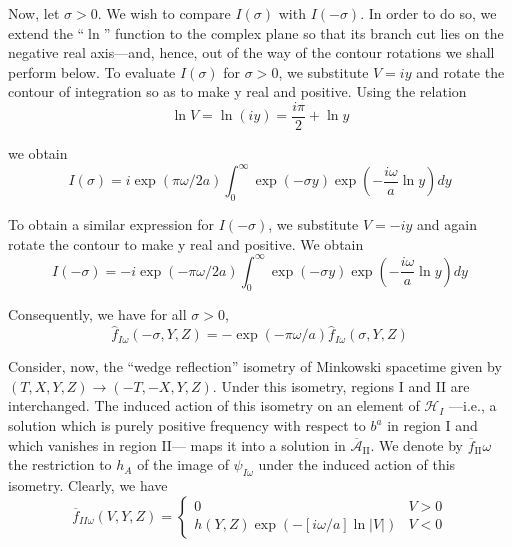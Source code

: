 \documentclass[11pt,a4paper]{article}
\begin{document}
Now, let \(\sigma > 0\). We wish to compare \(I(\sigma)\) with \(I(-\sigma)\). In order to do so, we extend the ``\(\ln\)'' function to the complex plane so that its branch cut lies on the negative real axis---and, hence, out of the way of the contour rotations we shall perform below. To evaluate \(I(\sigma)\) for \(\sigma > 0\), we substitute \(V=iy\) and rotate the contour of integration so as to make y real and positive. Using the relation
\begin{equation*}
\ln V=\ln(iy)=\frac{i\pi}{2}+\ln y \tag{5.1.12}\label{eq:5.1.12}
\end{equation*}

we obtain
\begin{equation*}
I(\sigma) = i \exp(\pi \omega/2a) \int_0^\infty \exp(-\sigma y) \exp\left(-\frac{i\omega}{a} \ln y\right) dy \tag{5.1.13}\label{eq:5.1.13}
\end{equation*}

To obtain a similar expression for \(I(-\sigma)\), we substitute \(V=-iy\) and again rotate the contour to make y real and positive. We obtain
\begin{equation*}
I(-\sigma) = -i \exp(-\pi\omega/2a) \int_0^\infty \exp(-\sigma y) \exp\left(-\frac{i\omega}{a} \ln y\right) dy \tag{5.1.14}\label{eq:5.1.14}
\end{equation*}

Consequently, we have for all \(\sigma > 0\),
\begin{equation*}
\hat{f}_{I\omega}(-\sigma, Y, Z) = -\exp(-\pi\omega/a) \hat{f}_{I\omega}(\sigma, Y, Z) \tag{5.1.15}\label{eq:5.1.15}
\end{equation*}

Consider, now, the ``wedge reflection'' isometry of Minkowski spacetime given by \((T,X,Y,Z)\rightarrow (-T,-X,Y,Z)\). Under this isometry, regions I and II are interchanged. The induced action of this isometry on an element of \(\mathcal{H}_I\) ---i.e., a solution which is purely positive frequency with respect to \(b^a\) in region I and which vanishes in region II--- \hypertarget{source-126}{} maps it into a solution in \(\overline{\mathcal{A}}_{\mathrm{II}}\). We denote by \(\overline{f}_{\mathrm{II}}\omega\) the restriction to \(h_A\) of the image of \(\psi_{I \omega}\) under the induced action of this isometry. Clearly, we have
\begin{equation*}
\overline{f}_{II\omega} (V,Y,Z) = \begin{cases} 0 & V>0 \\ h(Y,Z) \exp(-[i\omega/a] \ln |V|) & V<0 \end{cases} \tag{5.1.16}\label{eq:5.1.16}
\end{equation*}
\end{document}
